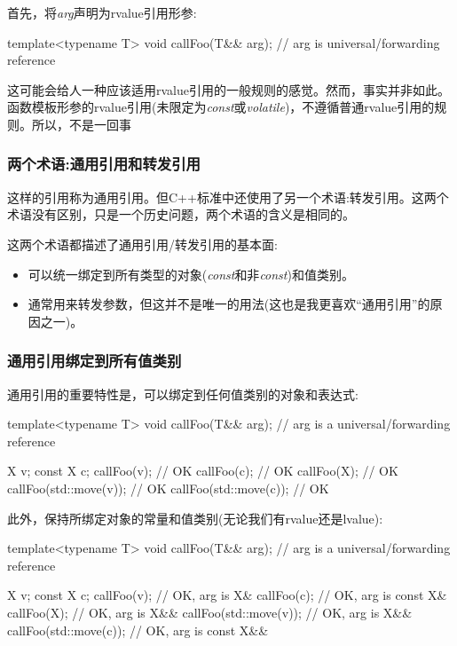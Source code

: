 首先，将\textit{arg}声明为rvalue引用形参:

\begin{cppcode}
template<typename T>
void callFoo(T&& arg); // arg is universal/forwarding reference
\end{cppcode}

这可能会给人一种应该适用rvalue引用的一般规则的感觉。然而，事实并非如此。函数模板形参的rvalue引用(未限定为\textit{const}或\textit{volatile})，不遵循普通rvalue引用的规则。所以，不是一回事

\subsubsection{两个术语:通用引用和转发引用}

这样的引用称为通用引用。但C++标准中还使用了另一个术语:转发引用。这两个术语没有区别，只是一个历史问题，两个术语的含义是相同的。

这两个术语都描述了通用引用/转发引用的基本面:

\begin{itemize}
	\item 可以统一绑定到所有类型的对象(\textit{const}和非\textit{const})和值类别。
	\item 通常用来转发参数，但这并不是唯一的用法(这也是我更喜欢“通用引用”的原因之一)。
\end{itemize}

\subsubsection{通用引用绑定到所有值类别}

通用引用的重要特性是，可以绑定到任何值类别的对象和表达式:

\begin{cppcode}
template<typename T>
void callFoo(T&& arg); // arg is a universal/forwarding reference

X v;
const X c;
callFoo(v); // OK
callFoo(c); // OK
callFoo(X{}); // OK
callFoo(std::move(v)); // OK
callFoo(std::move(c)); // OK
\end{cppcode}

此外，保持所绑定对象的常量和值类别(无论我们有rvalue还是lvalue):

\begin{cppcode}
template<typename T>
void callFoo(T&& arg); // arg is a universal/forwarding reference

X v;
const X c;
callFoo(v); // OK, arg is X&
callFoo(c); // OK, arg is const X&
callFoo(X{}); // OK, arg is X&&
callFoo(std::move(v)); // OK, arg is X&&
callFoo(std::move(c)); // OK, arg is const X&&
\end{cppcode}


